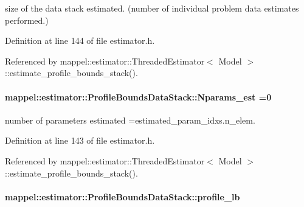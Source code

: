size of the data stack estimated. (number of individual problem data estimates performed.) 



Definition at line 144 of file estimator.\+h.



Referenced by mappel\+::estimator\+::\+Threaded\+Estimator$<$ Model $>$\+::estimate\+\_\+profile\+\_\+bounds\+\_\+stack().

\paragraph[{\texorpdfstring{Nparams\+\_\+est}{Nparams_est}}]{ mappel\+::estimator\+::\+Profile\+Bounds\+Data\+Stack\+::\+Nparams\+\_\+est =0}\hypertarget{structmappel_1_1estimator_1_1ProfileBoundsDataStack_ae99f72e8d82cabed72b22fd6200c7322}{}\label{structmappel_1_1estimator_1_1ProfileBoundsDataStack_ae99f72e8d82cabed72b22fd6200c7322}


number of parameters estimated =estimated\+\_\+param\+\_\+idxs.\+n\+\_\+elem. 



Definition at line 143 of file estimator.\+h.



Referenced by mappel\+::estimator\+::\+Threaded\+Estimator$<$ Model $>$\+::estimate\+\_\+profile\+\_\+bounds\+\_\+stack().

\paragraph[{\texorpdfstring{profile\+\_\+lb}{profile_lb}}]{ mappel\+::estimator\+::\+Profile\+Bounds\+Data\+Stack\+::profile\+\_\+lb}\hypertarget{structmappel_1_1estimator_1_1ProfileBoundsDataStack_ae37af08a6f31e748d44763a9fd83c5b1}{}\label{structmappel_1_1estimator_1_1ProfileBoundsDataStack_ae37af08a6f31e748d44763a9fd83c5b1}


